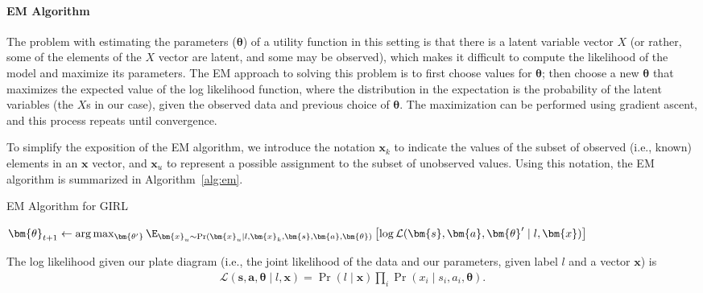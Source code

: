 
\vspace{\up}
\paragraph{EM Algorithm}

The problem with estimating the parameters ($\bm{\theta}$) of a
utility function in this setting is that there is a latent variable
vector $X$ (or rather, some of the elements of the $X$ vector are
latent, and some may be observed), which makes it difficult to compute
the likelihood of the model and maximize its parameters.  The EM
approach to solving this problem is to first choose values for
$\bm{\theta}$; then choose a new $\bm{\theta}$ that maximizes the
expected value of the log likelihood function, where the distribution
in the expectation is the probability of the latent variables (the
$X$s in our case), given the observed data and previous choice of
$\bm{\theta}$.  The maximization can be performed using gradient
ascent, and this process repeats until convergence.

To simplify the exposition of the EM algorithm, we introduce the
notation $\bm{x}_k$ to indicate the values of the subset of observed
(i.e., known) elements in an $\bm{x}$ vector, and $\bm{x}_u$ to
represent a possible assignment to the subset of unobserved values.
Using this notation, the EM algorithm is summarized in
Algorithm~\ref{alg:em}.

\begin{algorithm}
\caption{EM Algorithm for GIRL}
\begin{algorithmic}
\State $\bm{\theta}_{t+1} \gets \arg \max_{\bm{\theta'}} \E_{\bm{x}_u \sim \Pr(\bm{x}_u \mid l, \bm{x}_k, \bm{s}, \bm{a}, \bm{\theta})} \left[ \log\mathcal{L}(\bm{s}, \bm{a}, \bm{\theta}' \mid l, \bm{x}) \right]$
\EndFor
\end{algorithmic}
\label{alg:em}
\end{algorithm}

The log likelihood given our plate diagram (i.e., the joint likelihood
of the data and our parameters, given label $l$ and a vector $\bm{x}$)
is
%
%
\begin{align}
\mathcal{L}(\bm{s}, \bm{a}, \bm{\theta} \mid l, \bm{x}) 
= \Pr(l \mid \bm{x}) \prod_i \Pr(x_i \mid s_i, a_i, \bm{\theta}).
\end{align}

